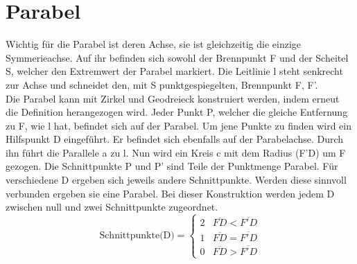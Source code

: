\section{Parabel}
Wichtig für die Parabel ist deren Achse, sie ist gleichzeitig die einzige Symmerieachse. Auf ihr befinden sich sowohl der Brennpunkt F und der Scheitel S, welcher den Extremwert der Parabel markiert. Die Leitlinie l steht senkrecht zur Achse und schneidet den, mit S punktgespiegelten, Brennpunkt F, F'.\\
Die Parabel kann mit Zirkel und Geodreieck konstruiert werden, indem erneut die Definition herangezogen wird. Jeder Punkt P, welcher die gleiche Entfernung zu F, wie l hat, befindet sich auf der Parabel. Um jene Punkte zu finden wird ein Hilfspunkt D eingeführt. Er befindet sich ebenfalls auf der Parabelachse. Durch ihn führt die Parallele a zu l. Nun wird ein Kreis c mit dem Radius (F'D) um F gezogen. Die Schnittpunkte P und P' sind Teile der Punktmenge Parabel. Für verschiedene D ergeben sich jeweils andere Schnittpunkte. Werden diese sinnvoll verbunden ergeben sie eine Parabel. Bei dieser Konstruktion werden jedem D zwischen null und zwei Schnittpunkte zugeordnet.
\begin{displaymath}
   \text{Schnittpunkte(D)} = \left\{
     \begin{array}{lr}
       2 & \overline{FD} < \overline{F'D}\\
       1 & \overline{FD} = \overline{F'D}\\
       0 & \overline{FD} > \overline{F'D}
     \end{array}
   \right.
\end{displaymath}
